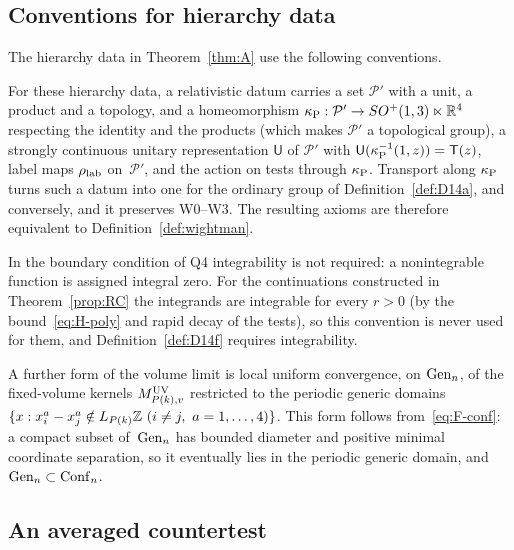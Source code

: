 \subsection{Conventions for hierarchy data}\label{sec:formal-conventions}

The hierarchy data in Theorem~\ref{thm:A} use the following conventions.

\begin{remark}\label{rem:formal-poincare}
For these hierarchy data, a relativistic datum carries a set $\mathcal P'$ with a unit, a product and a topology, and a homeomorphism $\kappa_{\rm P}:\mathcal P'\to SO^+(1,3)\ltimes\mathbb{R}^4$ respecting the identity and the products (which makes $\mathcal P'$ a topological group), a strongly continuous unitary representation $\mathsf U$ of $\mathcal P'$ with $\mathsf U(\kappa_{\rm P}^{-1}(1,z))=\mathsf T(z)$, label maps $\rho_{\rm lab}$ on~$\mathcal P'$, and the action on tests through $\kappa_{\rm P}$. Transport along $\kappa_{\rm P}$ turns such a datum into one for the ordinary group of Definition~\ref{def:D14a}, and conversely, and it preserves W0--W3. The resulting axioms are therefore equivalent to Definition~\ref{def:wightman}.
\end{remark}

\begin{remark}\label{rem:integral-zero}
In the boundary condition of Q4 integrability is not required: a nonintegrable function is assigned integral zero. For the continuations constructed in Theorem~\ref{prop:RC} the integrands are integrable for every $r>0$ (by the bound~\eqref{eq:H-poly} and rapid decay of the tests), so this convention is never used for them, and Definition~\ref{def:D14f} requires integrability.
\end{remark}

A further form of the volume limit is local uniform convergence, on $\mathrm{Gen}_{n}$, of the fixed-volume kernels $M^{\rm UV}_{P(k),v}$ restricted to the periodic generic domains $\{x:x_i^a-x_j^a\notin L_{P(k)}\Z\ (i\ne j,\ a=1,\ldots,4)\}$. This form follows from~\eqref{eq:F-conf}: a compact subset of~$\mathrm{Gen}_{n}$ has bounded diameter and positive minimal coordinate separation, so it eventually lies in the periodic generic domain, and $\mathrm{Gen}_{n}\subset\mathrm{Conf}_{n}$.

\subsection{An averaged countertest}\label{sec:averaged-countertest}

